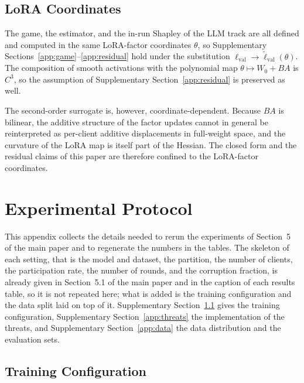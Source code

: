 \documentclass[letterpaper]{article} %
\theoremstyle{plain}
\newcommand{\lval}{\ell_{\mathrm{val}}}
\begin{document}
\subsection{LoRA Coordinates}
\label{app:lora}

The game, the estimator, and the in-run Shapley of the LLM track are all
defined and computed in the same LoRA-factor coordinates $\theta$, so
Supplementary Sections~\ref{app:game}--\ref{app:residual} hold under the
substitution $\lval \to \tilde\ell_{\mathrm{val}}(\theta)$. The composition of
smooth activations with the polynomial map $\theta \mapsto W_0 + BA$ is
$C^3$, so the assumption of Supplementary Section~\ref{app:residual} is
preserved as well.

The second-order surrogate is, however, coordinate-dependent. Because $BA$ is
bilinear, the additive structure of the factor updates cannot in general be
reinterpreted as per-client additive displacements in full-weight space, and
the curvature of the LoRA map is itself part of the Hessian. The closed form
and the residual claims of this paper are therefore confined to the
LoRA-factor coordinates.

\section{Experimental Protocol}
\label{app:protocol}

This appendix collects the details needed to rerun the experiments of
Section~5 of the main paper and to regenerate the numbers in the tables. The
skeleton of each setting, that is the model and dataset, the partition, the
number of clients, the participation rate, the number of rounds, and the
corruption fraction, is already given in Section~5.1 of the main paper and in
the caption of each results table, so it is not repeated here; what is added
is the training configuration and the data split laid on top of it.
Supplementary Section~\ref{app:train} gives the training configuration,
Supplementary Section~\ref{app:threats} the implementation of the threats,
and Supplementary Section~\ref{app:data} the data distribution and the
evaluation sets.

\subsection{Training Configuration}
\label{app:train}
\end{document}
